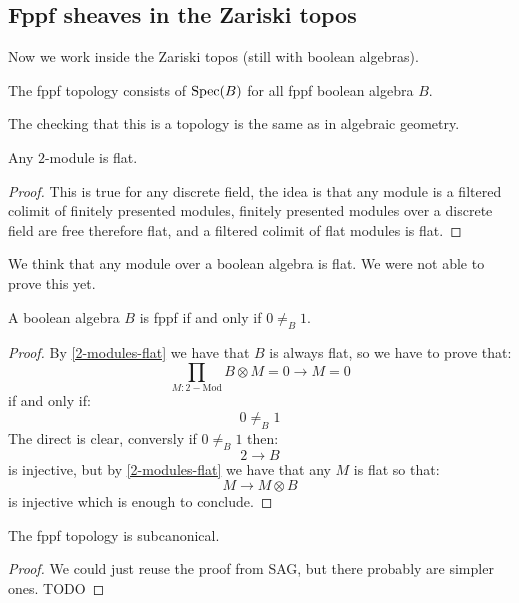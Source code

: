 \subsection{Fppf sheaves in the Zariski topos}

Now we work inside the Zariski topos (still with boolean algebras).

\begin{definition}
The fppf topology consists of $\operatorname{Spec}(B)$ for all fppf boolean algebra $B$.
\end{definition}

The checking that this is a topology is the same as in algebraic geometry.

\begin{lemma}\label{2-modules-flat}
Any $2$-module is flat.
\end{lemma}

\begin{proof}
This is true for any discrete field, the idea is that any module is a filtered colimit of finitely presented modules, finitely presented modules over a discrete field are free therefore flat, and a filtered colimit of flat modules is flat.
\end{proof}

\begin{remark}
We think that any module over a boolean algebra is flat. We were not able to prove this yet.
\end{remark}

\begin{lemma}
A boolean algebra $B$ is fppf if and only if $0\not=_B1$.
\end{lemma}

\begin{proof}
By \cref{2-modules-flat} we have that $B$ is always flat, so we have to prove that:
\[\prod_{M:2-\mathrm{Mod}} B\otimes M = 0 \to M=0\]
if and only if:
\[0\not=_B1\]
The direct is clear, conversly if $0\not=_B1$ then:
\[2\to B\]
is injective, but by \cref{2-modules-flat} we have that any $M$ is flat so that:
\[M\to M\otimes B\]
is injective which is enough to conclude.
\end{proof}

\begin{lemma}
The fppf topology is subcanonical.
\end{lemma}

\begin{proof}
We could just reuse the proof from SAG, but there probably are simpler ones. TODO
\end{proof}

